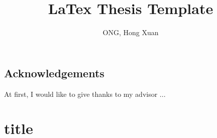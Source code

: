 \documentclass[12pt]{report}
\title{LaTex Thesis Template}	%
\author{ONG, Hong Xuan}			%
\begin{document}
	\maketitle
	\tableofcontents
	
	\chapter*{Acknowledgements}
	At first, I would like to give thanks to my advisor ...
	
	\listoffigures\part{title}
	\listoftables
	
	\newpage\cleardoublepage
	\newpage\cleardoublepage
	\newpage\cleardoublepage
	\newpage\cleardoublepage
	\newpage\cleardoublepage
	
	\nocite{*}
	\newpage\cleardoublepage
	
\end{document}
